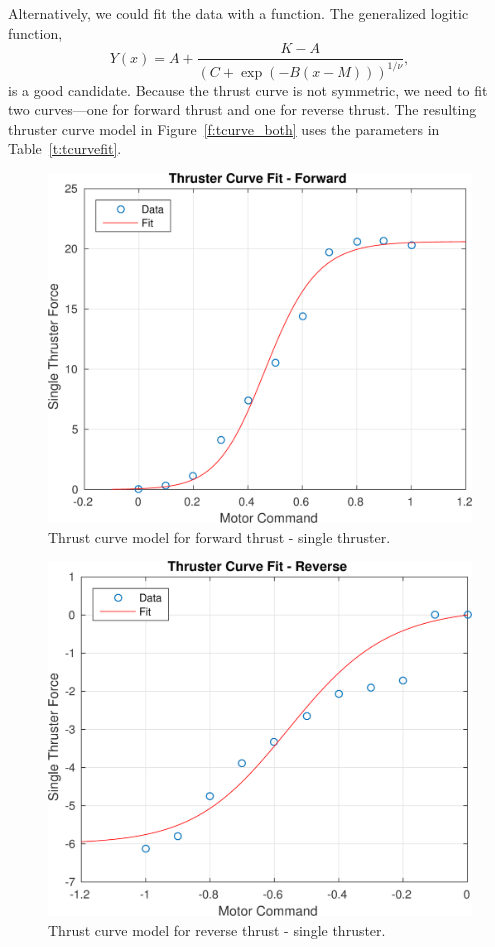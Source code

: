 \documentclass[11pt,draftcls,journal,onecolumn]{IEEEtran}
\begin{document}
Alternatively, we could fit the data with a function.  The generalized logitic function,
\begin{equation}
Y(x) = A + \frac{K-A}{ \left(C + \exp{(-B(x-M))} \right)^{1/\nu} },
\end{equation}
is a good candidate.  Because the thrust curve is not symmetric, we need to fit two curves---one for forward thrust and one for reverse thrust.  The resulting thruster curve model in Figure~\ref{f:tcurve_both} uses the parameters in Table~\ref{t:tcurvefit}.

\begin{figure}[htbp]
\centering
\includegraphics[width=0.7\linewidth]{tcurve_pos.png}
\caption{Thrust curve model for forward thrust - single thruster.}
\label{f:tcurve_pos}
\end{figure}

\begin{figure}[htbp]
\centering
\includegraphics[width=0.7\linewidth]{tcurve_neg.png}
\caption{Thrust curve model for reverse thrust - single thruster.}
\label{f:tcurve_neg}
\end{figure}
\end{document}
